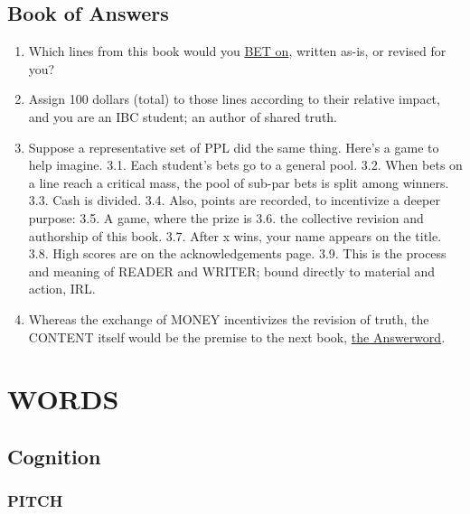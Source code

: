 \documentclass[
]{book}
\begin{document}
\hypertarget{book-of-answers}{%
\section{Book of Answers}\label{book-of-answers}}

\begin{enumerate}
\def\labelenumi{\arabic{enumi}.}
\item
  Which lines from this book would you \protect\hyperlink{how-to-read}{BET on}, written as-is, or revised for you?
\item
  Assign 100 dollars (total) to those lines according to their relative impact, and you are an IBC student; an author of shared truth.
\item
  Suppose a representative set of PPL did the same thing. Here's a game to help imagine.
  3.1. Each student's bets go to a general pool.
  3.2. When bets on a line reach a critical mass, the pool of sub-par bets is split among winners.
  3.3. Cash is divided.
  3.4. Also, points are recorded, to incentivize a deeper purpose:
  3.5. A game, where the prize is
  3.6. the collective revision and authorship of this book.
  3.7. After x wins, your name appears on the title.
  3.8. High scores are on the acknowledgements page.
  3.9. This is the process and meaning of READER and WRITER; bound directly to material and action, IRL.
\item
  Whereas the exchange of MONEY incentivizes the revision of truth, the CONTENT itself would be the premise to the next book, \protect\hyperlink{the-answerword}{the Answerword}.
\end{enumerate}

\hypertarget{words}{%
\chapter{WORDS}\label{words}}

\hypertarget{cognition}{%
\section{Cognition}\label{cognition}}

\hypertarget{pitch-1}{%
\subsection{PITCH}\label{pitch-1}}
\end{document}
